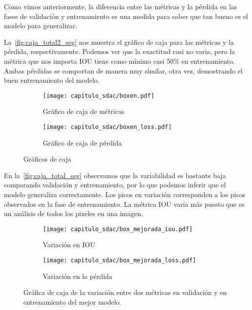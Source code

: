 Como vimos anteriormente, la diferencia entre las métricas y la pérdida en las fases de validación
y entrenamiento es una medida para saber que tan bueno es el modelo para generalizar. 

La~\autoref{fig:caja_total2_seg} nos muestra el gráfico de caja para las
métricas y la pérdida, respectivamente. Podemos ver que la exactitud casi no
varia, pero la métrica que nos importa IOU tiene como mínimo casi 50\% en
entrenamiento. Ambas pérdidas se comportan de manera muy similar, otra vez,
demostrando el buen entrenamiento del modelo.

\begin{figure}[H]
    \centering
    \begin{subfigure}[b]{0.8\textwidth}
        \centering
       \texttt{[image: capitulo\_sdac/boxen.pdf]}
       \caption{Gráfico de caja de métricas}\label{fig:caja_acc2_seg} 
    \end{subfigure}

    \begin{subfigure}[b]{0.8\textwidth}
        \centering
       \texttt{[image: capitulo\_sdac/boxen\_loss.pdf]}
       \caption{Gráfico de caja de pérdida}\label{fig:caja_loss2_seg}
    \end{subfigure}
    \caption{Gráficos de caja}\label{fig:caja_total2_seg}
\end{figure}

En la~\autoref{fig:caja_total_seg} observamos que la variabilidad es bastante
baja comparando validación y entrenamiento, por lo que podemos inferir que el
modelo generaliza correctamente. Los picos en variación corresponden a los picos
observados en la fase de entrenamiento. La métrica IOU varía más puesto que es
un análisis de todos los pixeles en una imagen.

\begin{figure}[H]
    \centering
    \begin{subfigure}[b]{0.6\textwidth}
        \centering
       \texttt{[image: capitulo\_sdac/box\_mejorada\_iou.pdf]}
       \caption{Variación en IOU}\label{fig:caja_acc_seg} 
    \end{subfigure}

    \begin{subfigure}[b]{0.6\textwidth}
        \centering
       \texttt{[image: capitulo\_sdac/box\_mejorada\_loss.pdf]}
       \caption{Variación en la pérdida}\label{fig:caja_loss_seg}
    \end{subfigure}
    \caption{Gráfica de caja de la variación entre dos métricas en validación y en entrenamiento del mejor modelo.}\label{fig:caja_total_seg}
\end{figure}

